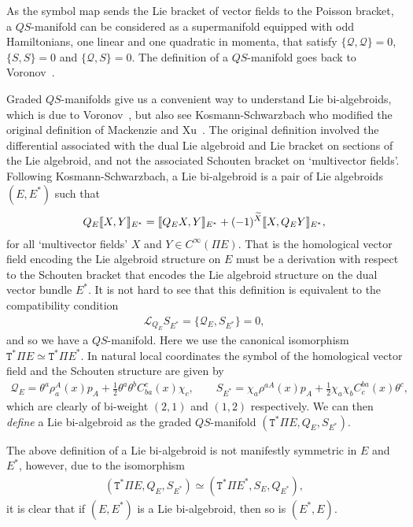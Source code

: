 \documentclass[pdftex]{sigma}
\newcommand{\Dleft}{[\hspace{-1.5pt}[}
\newcommand{\Dright}{]\hspace{-1.5pt}]}
\newcommand{\SN}[1]{\Dleft #1 \Dright}
\def\sT{{\mathtt T}}
\numberwithin{equation}{section}
\begin{document}
As the symbol map sends the Lie bracket of vector f\/ields to the Poisson bracket, a $QS$-manifold can be considered as a supermanifold equipped with odd Hamiltonians, one linear and one quadratic in momenta, that satisfy $\{\mathcal{Q}, \mathcal{Q} \} =0$,  $\{S,S\}=0$ and $\{ \mathcal{Q}, S\} =0$. The def\/inition of a $QS$-manifold goes back to Voronov~\cite{Voronov:2001qf}.


Graded $QS$-manifolds give us a convenient way to understand Lie bi-algebroids, which is due to Voronov~\cite{Voronov:2001qf}, but also see  Kosmann-Schwarzbach \cite{Kosmann-Schwarzbach:1995}  who modif\/ied the original def\/inition of Mackenzie and  Xu~\cite{Mackenzie:1994}. The original def\/inition involved the dif\/ferential associated with the dual Lie algebroid and Lie bracket on sections of the Lie algebroid, and not the associated  Schouten bracket on `multivector f\/ields'.  Following  Kosmann-Schwarzbach,  a Lie bi-algebroid is a pair of Lie algebroids $(E, E^{*})$ such that
\begin{gather*}
Q_{E}\SN{X,Y}_{E^{*}} = \SN{Q_{E}X, Y}_{E^{*}} + (-1)^{\widetilde{X}}\SN{X, Q_{E} Y}_{E^{*}},
\end{gather*}
for all `multivector f\/ields' $X$ and $Y \in C^{\infty}(\Pi E)$. That is the homological vector f\/ield encoding the Lie algebroid structure on $E$ must be a derivation with respect to the Schouten bracket that encodes the Lie algebroid structure on the dual vector bundle $E^{*}$. It is not hard to see that this def\/inition is equivalent to the compatibility condition
\begin{gather*}
\mathcal{L}_{Q_{E}}S_{E^{*}} = \{ \mathcal{Q}_{E}, S_{E^{*}}\} =0,
\end{gather*}
and so we have a $QS$-manifold.
 Here we use the canonical isomorphism $\sT^{*}\Pi E \simeq \sT^{*}\Pi E^{*}$.
In natural local coordinates the symbol of the homological vector f\/ield and the Schouten structure are given by
\begin{gather*}
\mathcal{Q}_{E}  =  \theta^{a}\rho_{a}^{A}(x)p_{A} + \frac{1}{2} \theta^{a}\theta^{b}C_{ba}^{c}(x) \chi_{c},\qquad
S_{E^{*}}  = \chi_{a}\rho^{aA}(x)p_{A} + \frac{1}{2} \chi_{a}\chi_{b} C^{ba}_{c}(x) \theta^{c},
\end{gather*}
 which are clearly of bi-weight $(2,1)$ and $(1,2)$ respectively. We can then \emph{define} a Lie bi-algebroid as the graded $QS$-manifold $(\sT^{*}\Pi E, Q_{E}, S_{E^{*}})$.

The above def\/inition of a Lie bi-algebroid is not manifestly symmetric in $E$ and $E^{*}$, however, due to the isomorphism
\begin{gather*}
 (\sT^{*}\Pi E,Q_E,S_{E^*} ) \simeq  (\sT^{*}\Pi E^{*},S_E,Q_{E^*} ) ,
\end{gather*}
it is clear that if $(E, E^{*})$ is a Lie bi-algebroid, then so is $(E^{*}, E)$.
\end{document}
